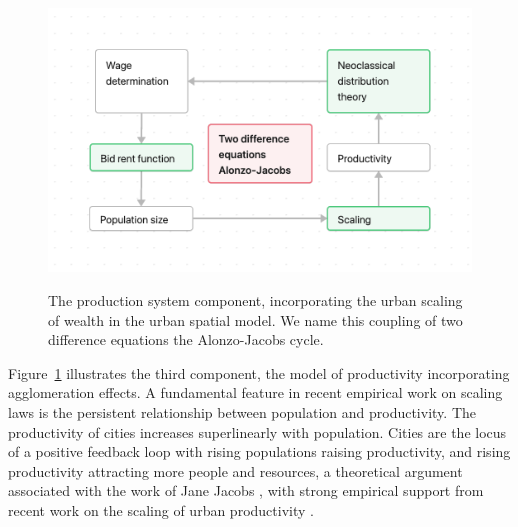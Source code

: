 \begin{figure}[!ht]
    \centering
    \includegraphics[scale=.7]{fig/flow_alonzo-jacobs_cycle.png}
    \label{fig-alonzo-jacobs-cycle}
\caption[Production system.]{The production system component, incorporating the urban scaling of wealth in the urban spatial model. We name this coupling of two difference equations the Alonzo-Jacobs cycle.}
\end{figure}

Figure~\ref{fig-alonzo-jacobs-cycle} illustrates the third component, the model of productivity incorporating agglomeration effects. %
A fundamental feature in recent empirical work on scaling laws is %
the persistent relationship between population and productivity. The productivity of cities increases superlinearly with population. Cities are the locus of a positive feedback loop with rising populations raising productivity, and rising productivity attracting more people and resources, a theoretical argument associated with the work of Jane Jacobs \cite{jacobsEconomyCities1969}, with strong empirical support from recent work on the scaling of urban productivity  \cite{bettencourtGrowthInnovationScaling2007, bettencourtOriginsScalingCities2013, dongUnderstandingMesoscopicScaling2020, loboUrbanScalingProduction2013}.

